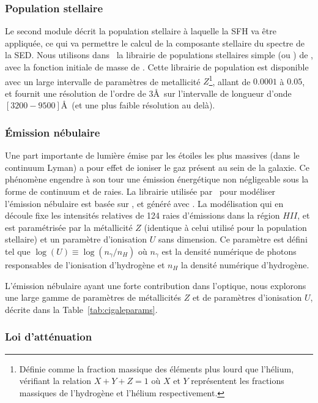 \documentclass[../main/main.tex]{subfiles}
\begin{document}
\subsubsection{Population stellaire}
Le second module décrit la population stellaire à laquelle la SFH va
être appliquée, ce qui va permettre le calcul de la composante stellaire
du spectre de la SED. Nous utilisons dans \hypergal\ la librairie de
populations stellaires simple \textbf{} (ou ) de
\citet{BCO3}, avec la fonction initiale de masse de
\citet{Chabrier2003}. Cette librairie de population est disponible avec
un large intervalle de paramètres de metallicité $Z$\footnote{Définie comme
  la fraction massique des éléments plus lourd que l'hélium, vérifiant
  la relation $X+Y+Z=1$ où $X$ et $Y$ représentent les fractions massiques
  de l'hydrogène et l'hélium respectivement.}, allant de $0.0001$ à
$0.05$, et fournit une résolution de l'ordre de $3$\AA\ sur l'intervalle
de longueur d'onde $[3200-9500]$\AA\ (et une plus faible résolution au delà).


\subsubsection{\'Emission nébulaire}

Une part importante de lumière émise par les étoiles les plus massives
(dans le continuum Lyman) a pour effet de ioniser le gaz présent au sein
de la galaxie. Ce phénomène engendre à son tour une émission énergétique
non négligeable sous la forme de continuum et de raies. La librairie
utilisée par \cigale\ pour modéliser l'émission nébulaire est basée sur
\citet{Inoue2011}, et généré avec  \citep{Ferland2013}.
La modélisation qui en découle fixe les intensités relatives de 124
raies d'émissions dans la région $HII$, et est paramétrisée par la
métallicité $Z$ (identique à celui utilisé pour la population stellaire)
et un paramètre d'ionisation $U$ sans dimension. Ce paramètre est défini
tel que $\log(U)\equiv \log(n_{\gamma}/n_H)$ où $n_{\gamma}$ est la
densité numérique de photons responsables de l'ionisation d'hydrogène et
$n_H$ la densité numérique d'hydrogène.

L'émission nébulaire ayant une forte contribution dans l'optique, nous
explorons une large gamme de paramètres de métallicités $Z$ et de
paramètres d'ionisation $U$, décrite dans la Table~\ref{tab:cigaleparams}.

\subsubsection{Loi d'atténuation}
\end{document}
